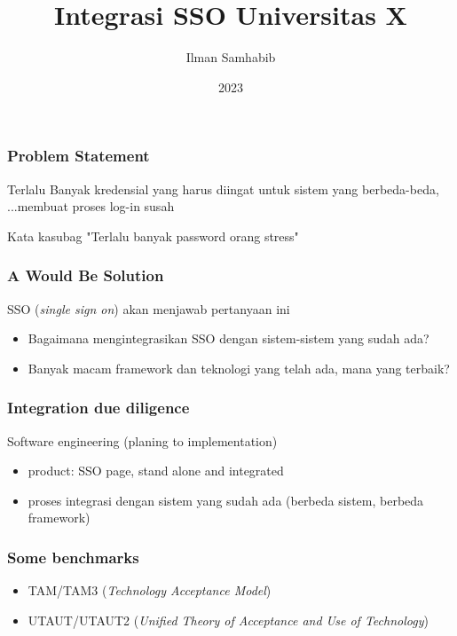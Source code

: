 \documentclass{beamer}
\title{Integrasi SSO Universitas X}
\author{Ilman Samhabib}
\institute{UG}
\date{2023}
\begin{document}
\frame{\titlepage}

\begin{frame}
    \frametitle{Problem Statement}
    Terlalu Banyak kredensial yang harus diingat untuk sistem yang berbeda-beda, ...membuat proses log-in susah

    \begin{block}{Kata kasubag}
        "Terlalu banyak password orang stress"
    \end{block}
\end{frame}

\begin{frame}
    \frametitle{A Would Be Solution}
    SSO (\emph{single sign on}) akan menjawab pertanyaan ini
    \begin{itemize}
        \item Bagaimana mengintegrasikan SSO dengan sistem-sistem yang sudah ada?
        \item Banyak macam framework dan teknologi yang telah ada, mana yang terbaik?
    \end{itemize}
\end{frame}

\begin{frame}
    \frametitle{Integration due diligence}
    Software engineering (planing to implementation)
    \begin{itemize}
        \item product: SSO page, stand alone and integrated
        \item proses integrasi dengan sistem yang sudah ada (berbeda sistem, berbeda framework)
    \end{itemize}
\end{frame}
\begin{frame}
    \frametitle{Some benchmarks}
    \begin{itemize}
        \item TAM/TAM3 (\emph{Technology Acceptance Model}) 
        \item UTAUT/UTAUT2 (\emph{Unified Theory of Acceptance and Use of Technology})
    \end{itemize}
\end{frame}
\end{document}
